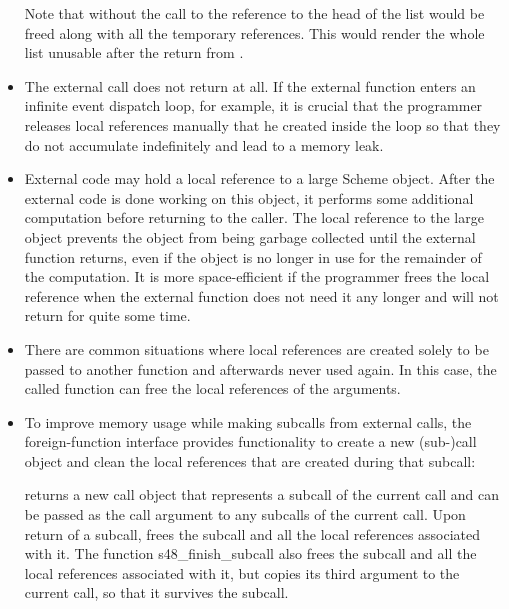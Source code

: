 \begin{itemize}
  \noindent{}Note that without the call to
   the reference to the head of the list
  would be freed along with all the temporary references.  This would
  render the whole list unusable after the return from .

\item The external call does not return at all.  If the external
  function enters an infinite event dispatch loop, for example, it is
  crucial that the programmer releases local references manually that
  he created inside the loop so that they do not accumulate
  indefinitely and lead to a memory leak.

\item External code may hold a local reference to a large Scheme
  object.  After the external code is done working on this object, it
  performs some additional computation before returning to the caller.
  The local reference to the large object prevents the object from
  being garbage collected until the external function returns, even if
  the object is no longer in use for the remainder of the computation.
  It is more space-efficient if the programmer frees the local
  reference when the external function does not need it any longer and
  will not return for quite some time.

\item There are common situations where local references are created
  solely to be passed to another function and afterwards never used
  again.  In this case, the called function can free the local
  references of the arguments.

\item To improve memory usage while making subcalls from external
  calls, the foreign-function interface provides functionality to
  create a new (sub-)call object and clean the local references that
  are created during that subcall:

  \begin{protos}
  \end{protos}

   returns a new call object that represents a
  subcall of the current call and can be passed as the call argument
  to any subcalls of the current call.  Upon return of a subcall,
   frees the subcall and all the local
  references associated with it.  The function {s48\_finish\_subcall}
  also frees the subcall and all the local references associated with
  it, but copies its third argument to the current call, so that it
  survives the subcall.

\end{itemize}

